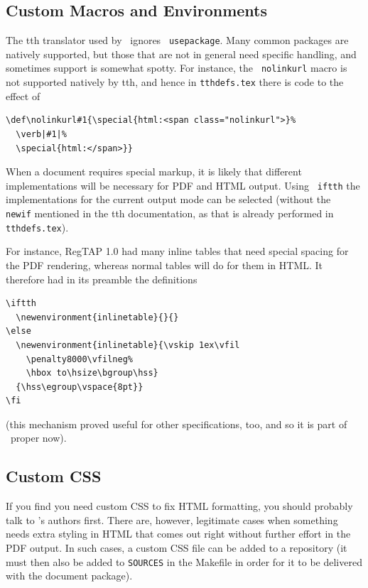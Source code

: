 \documentclass[11pt,a4paper]{ivoa}
\newcommand{\texword}[1]{\texttt{\color{texcolor} #1}}
\begin{document}
\subsection{Custom Macros and Environments}

The tth translator used by \ivoatex\ ignores \texword{usepackage}.  Many
common packages are natively supported, but those that are not in
general need specific handling, and sometimes support is somewhat spotty.
For instance, the \texword{nolinkurl}
macro is not supported natively by tth, and hence in
\texttt{tthdefs.tex} there is code to the effect of
\begin{lstlisting}[basicstyle=\footnotesize]
\def\nolinkurl#1{\special{html:<span class="nolinkurl">}%
  \verb|#1|%
  \special{html:</span>}}
\end{lstlisting}

When a document requires special markup, it is likely that
different implementations will be necessary for PDF and HTML output.
Using \texword{iftth} the implementations for the current output mode
can be selected (without the \texword{newif} mentioned in the tth
documentation, as that is already performed in \texttt{tthdefs.tex}).

For instance, RegTAP 1.0 had many inline tables that need special spacing
for the PDF rendering, whereas normal tables will do for them
in HTML.  It therefore
had in its preamble the definitions
\begin{lstlisting}
\iftth
  \newenvironment{inlinetable}{}{}
\else
  \newenvironment{inlinetable}{\vskip 1ex\vfil
    \penalty8000\vfilneg%
    \hbox to\hsize\bgroup\hss}
  {\hss\egroup\vspace{8pt}}
\fi
\end{lstlisting}

(this mechanism proved useful for other specifications, too, and so
it is part of \ivoatex~proper now).

\subsection{Custom CSS}
\label{sect:customcss}

If you find you need custom CSS to fix HTML formatting, you should
probably talk to \ivoatex's authors first.  There are, however,
legitimate cases when something needs extra styling in HTML that
comes out right without further effort
in the PDF output.  In such cases, a custom CSS file can
be added to a repository (it must then also be added to \texttt{SOURCES}
in the Makefile in order for it to be delivered with the document
package).
\end{document}
